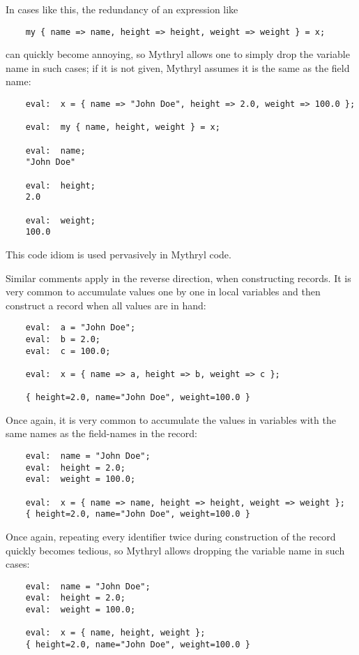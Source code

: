 In cases like this, the redundancy of an expression like

\begin{verbatim}
    my { name => name, height => height, weight => weight } = x;
\end{verbatim}

can quickly become annoying, so Mythryl allows one to simply 
drop the variable name in such cases;  if it is not given, Mythryl 
assumes it is the same as the field name:

\begin{verbatim}
    eval:  x = { name => "John Doe", height => 2.0, weight => 100.0 };

    eval:  my { name, height, weight } = x;

    eval:  name;
    "John Doe"

    eval:  height;
    2.0

    eval:  weight;
    100.0
\end{verbatim}

This code idiom is used pervasively in Mythryl code.

Similar comments apply in the reverse direction, when 
constructing records.  It is very common to accumulate values one by 
one in local variables and then construct a record when all values 
are in hand:

\begin{verbatim}
    eval:  a = "John Doe";
    eval:  b = 2.0;
    eval:  c = 100.0;

    eval:  x = { name => a, height => b, weight => c };

    { height=2.0, name="John Doe", weight=100.0 }
\end{verbatim}

Once again, it is very common to accumulate the values in variables 
with the same names as the field-names in the record:

\begin{verbatim}
    eval:  name = "John Doe";
    eval:  height = 2.0;
    eval:  weight = 100.0;

    eval:  x = { name => name, height => height, weight => weight };
    { height=2.0, name="John Doe", weight=100.0 }
\end{verbatim}

Once again, repeating every identifier twice during construction of the 
record quickly becomes tedious, so Mythryl allows dropping the variable 
name in such cases:

\begin{verbatim}
    eval:  name = "John Doe";
    eval:  height = 2.0;
    eval:  weight = 100.0;

    eval:  x = { name, height, weight };
    { height=2.0, name="John Doe", weight=100.0 }
\end{verbatim}

